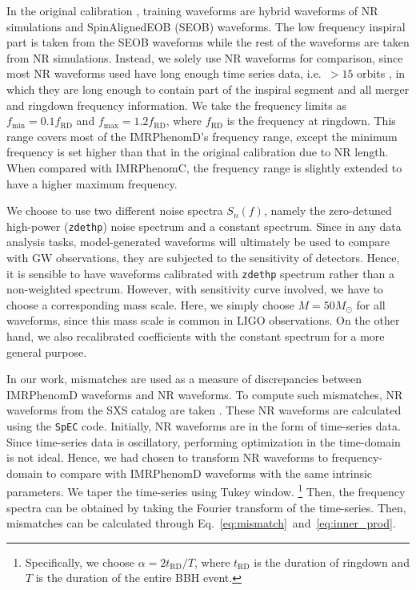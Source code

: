 \documentclass[twocolumn]{aastex631}
\newcommand{\zdethp}{\texttt{zdethp}}
\begin{document}
In the original calibration \cite{khan2016frequency,husa2016frequency}, training waveforms are hybrid waveforms of NR simulations and SpinAlignedEOB (SEOB) waveforms. The low frequency inspiral part is taken from the SEOB waveforms while the rest of the waveforms are taken from NR simulations. Instead, we solely use NR waveforms for comparison, since most NR waveforms used have long enough time series data, i.e.~$>15$ orbits \cite{boyle2019sxs}, in which they are long enough to contain part of the inspiral segment and all merger and ringdown frequency information. We take the frequency limits as $f_{\mathrm{min}}=0.1f_{\mathrm{RD}}$ and $f_{\mathrm{max}}=1.2f_{\mathrm{RD}}$, where $f_{\mathrm{RD}}$ is the frequency at ringdown. This range covers most of the IMRPhenomD's frequency range, except the minimum frequency is set higher than that in the original calibration due to NR length. When compared with IMRPhenomC, the frequency range is slightly extended to have a higher maximum frequency. 

We choose to use two different noise spectra $S_n(f)$, namely the zero-detuned high-power (\zdethp) noise spectrum and a constant spectrum. Since in any data analysis tasks, model-generated waveforms will ultimately be used to compare with GW observations, they are subjected to the sensitivity of detectors. Hence, it is sensible to have waveforms calibrated with {\zdethp} spectrum rather than a non-weighted spectrum. However, with sensitivity curve involved, we have to choose a corresponding mass scale. Here, we simply choose $M=50M_{\odot}$ for all waveforms, since this mass scale is common in LIGO observations. On the other hand, we also recalibrated coefficients with the constant spectrum for a more general purpose. 

In our work, mismatches are used as a measure of discrepancies between IMRPhenomD waveforms and NR waveforms. To compute such mismatches, NR waveforms from the SXS catalog are taken \cite{boyle2019sxs}. These NR waveforms are calculated using the \texttt{SpEC} code. Initially, NR waveforms are in the form of time-series data. Since time-series data is oscillatory, performing optimization in the time-domain is not ideal. Hence, we had chosen to transform NR waveforms to frequency-domain to compare with IMRPhenomD waveforms with the same intrinsic parameters. We taper the time-series using Tukey window. 
\footnote{
	Specifically, we choose $\alpha=2t_{\mathrm{RD}}/T$, where $t_{\mathrm{RD}}$ is the duration of ringdown and $T$ is the duration of the entire BBH event. 
} 
Then, the frequency spectra can be obtained by taking the Fourier transform of the time-series. Then, mismatches can be calculated through Eq.~\ref{eq:mismatch}~and~\ref{eq:inner_prod}. 
\end{document}
